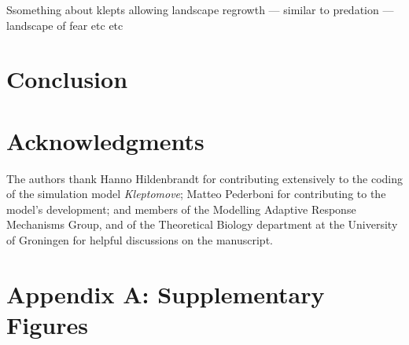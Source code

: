 \documentclass[11pt]{article}
\begin{document}

Ssomething about klepts allowing landscape regrowth --- similar to predation --- landscape of fear etc etc


\section{Conclusion}



\section{Acknowledgments}

The authors thank Hanno Hildenbrandt for contributing extensively to the coding of the simulation model \textit{Kleptomove};
Matteo Pederboni for contributing to the model's development; 
and members of the Modelling Adaptive Response Mechanisms Group, and of the Theoretical Biology department at the University of Groningen for helpful discussions on the manuscript.



\newpage{}

\section{Appendix A: Supplementary Figures}
\end{document}
